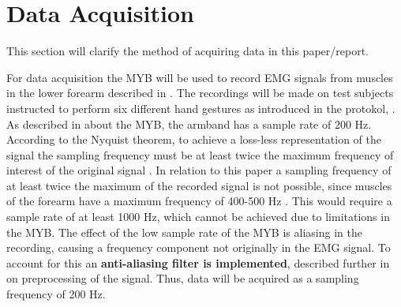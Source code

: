 \section{Data Acquisition} \label{sec:dataAcquisition}

This section will clarify the method of acquiring data in this paper/report.

For data acquisition the MYB will be used to record EMG signals from muscles in the lower forearm described in . The recordings will be made on test subjects instructed to perform six different hand gestures as introduced in the protokol, . As described in  about the MYB, the armband has a sample rate of 200 Hz. According to the Nyquist theorem, to achieve a loss-less representation of the signal the sampling frequency must be at least twice the maximum frequency of interest of the original signal \cite{Pozzo2004}. In relation to this paper a sampling frequency of at least twice the maximum of the recorded signal is not possible, since muscles of the forearm have a maximum frequency of 400-500 Hz \cite{Cram2012}. This would require a sample rate of at least 1000 Hz, which cannot be achieved due to limitations in the MYB. The effect of the low sample rate of the MYB is aliasing in the recording, causing a frequency component not originally in the EMG signal. To account for this an \textbf{anti-aliasing filter is implemented}, described further in  on preprocessing of the signal. Thus, data will be acquired as a sampling frequency of 200 Hz.

